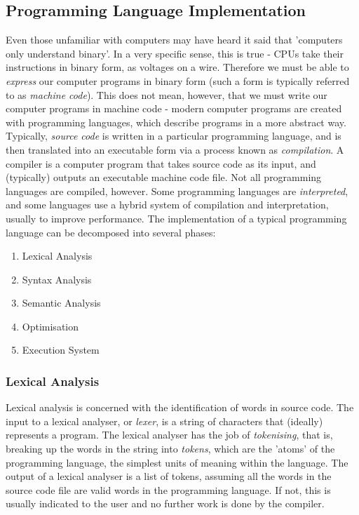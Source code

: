 \documentclass{article}
\begin{document}
\subsection{Programming Language Implementation}
Even those unfamiliar with computers may have heard it said that 'computers only understand binary'. In a very specific sense, this is true - CPUs take their instructions in binary form, as voltages on a wire. Therefore we must be able to \emph{express} our computer programs in binary form (such a form is typically referred to as \emph{machine code}). This does not mean, however, that we must write our computer programs in machine code - modern computer programs are created with programming languages, which describe programs in a more abstract way. Typically, \emph{source code} is written in a particular programming language, and is then translated into an executable form via a process known as \emph{compilation}. A compiler is a computer program that takes source code as its input, and (typically) outputs an executable machine code file. Not all programming languages are compiled, however. Some programming languages are \emph{interpreted}, and some languages use a hybrid system of compilation and interpretation, usually to improve performance. The implementation of a typical programming language can be decomposed into several phases: 
\begin{enumerate}
    \item Lexical Analysis
    \item Syntax Analysis
    \item Semantic Analysis
    \item Optimisation
    \item Execution System
\end{enumerate}

\subsubsection{Lexical Analysis}
Lexical analysis is concerned with the identification of words in source code. The input to a lexical analyser, or \emph{lexer}, is a string of characters that (ideally) represents a program. The lexical analyser has the job of \emph{tokenising}, that is, breaking up the words in the string into \emph{tokens}, which are the 'atoms' of the programming language, the simplest units of meaning within the language. The output of a lexical analyser is a list of tokens, assuming all the words in the source code file are valid words in the programming language. If not, this is usually indicated to the user and no further work is done by the compiler.
\end{document}
